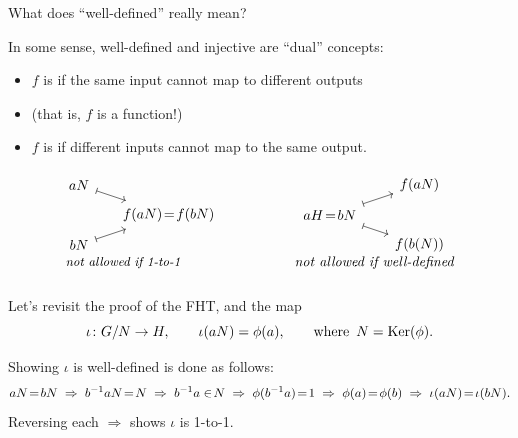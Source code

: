 \documentclass[8pt]{beamer}
\begin{document}
\begin{frame}{What does ``well-defined'' really mean?}

  In some sense, well-defined and injective are ``dual'' concepts: \smallskip
  \begin{itemize}
  \item $f$ is  if the same input cannot map to
    different outputs
  \item (that is, $f$ is a function!)
  \item $f$ is  if different inputs cannot map to
    the same output.
  \end{itemize}
  
  
  \[
  \begin{tikzpicture}[scale=.6,xscale=1.5]
    \begin{scope}[scale=2.5,inner sep=5pt]
      \node at (.5,-.8) {\small \emph{not allowed if 1-to-1}};
      \node (a) at (0,.5) {$aN$};
      \node (f) at (1,0) {$f(aN)\!=\!f(bN)$};
      \node (b) at (0,-.5) {$bN$};
      \draw[|->] (a) to (f);
      \draw[|->] (b) to (f);
    \end{scope}
    \begin{scope}[shift={(7,0)},scale=2.5,inner sep=4.5pt]
      \node at (.5,-.8) {\emph{not allowed if well-defined}};
      \node (fA) at (1,.5) {$f(aN)$};
      \node (aH) at (0,0) {$aH\!=\!bN$};
      \node (fB) at (1,-.5) {$f(b(N))$};
      \draw[|->] (aH) to (fA);
      \draw[|->] (aH) to (fB);
    \end{scope}
  \end{tikzpicture}
  \]

  Let's revisit the proof of the FHT, and the map
  \[
  \iota\colon G/N\to H,\qquad \iota(aN)=\phi(a),\qquad
  \text{where\, $N=\operatorname{Ker}(\phi)$}.
  \]

  Showing $\iota$ is well-defined is done as follows:
  \[
  aN\!=\!bN\hspace{1mm}\Rightarrow\hspace{1mm}
  b^{-1}aN\!=\!N \hspace{1mm}\Rightarrow\hspace{1mm}
  b^{-1}a\in\!N \hspace{1mm}\Rightarrow\hspace{1mm}
  \phi(b^{-1}a)\!=\!1
  \hspace{1mm}\Rightarrow\hspace{1mm}
  \phi(a)\!=\!\phi(b) \hspace{1mm}\Rightarrow\hspace{1mm}
  \iota(aN)\!=\!\iota(bN).
  \]
  Reversing each $\Rightarrow$ shows $\iota$ is 1-to-1.
  
  
\end{frame}
\end{document}
